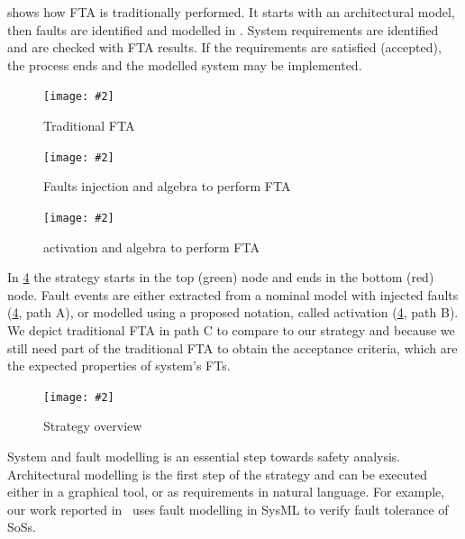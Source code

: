 \documentclass[12pt,openright,twoside,a4paper,oldfontcommands,english,brazil,final]{abntex2}
\theoremstyle{theo}
\newcommand{\includegraphicsaspectratio}[2][1]{%
  \texttt{[image: \#2]}%
}
\begin{document}
 shows how \ac{FTA} is traditionally performed.
It starts with an architectural model, then faults are identified and modelled in .
System requirements are identified and are checked with \ac{FTA} results.
If the requirements are satisfied (accepted), the process ends and the modelled system may be implemented.

\begin{figure}[htb]
  \centering
  \includegraphicsaspectratio[0.55]{StrategyOverview-traditional-path}
  \caption{Traditional \ac{FTA}}
  \label{fig:strategy-overview-traditional}
\end{figure}

\begin{figure}[htb]
  \centering
  \includegraphicsaspectratio[0.8]{StrategyOverview-csp-path}
  \caption{Faults injection and \ac{algebra} to perform \ac{FTA}}
  \label{fig:strategy-overview-csp}
\end{figure}

\begin{figure}[htb]
  \centering
  \includegraphicsaspectratio[0.8]{StrategyOverview-activation-path}
  \caption{\Ac{activation} and \ac{algebra} to perform \ac{FTA}}
  \label{fig:strategy-overview-activation}
\end{figure}

In \cref{fig:strategy-overview} the strategy starts in the top (green) node and ends in the bottom (red) node.
Fault events are either extracted from a nominal model with injected faults (\cref{fig:strategy-overview}, path A), or modelled using a proposed notation, called \ac{activation} (\cref{fig:strategy-overview}, path B).
We depict traditional \ac{FTA} in path C to compare to our strategy and because we still need part of the traditional \ac{FTA} to obtain the acceptance criteria, which are the expected properties of system's \acp{FT}.

\begin{figure}[htb]
  \centering
  \includegraphicsaspectratio[0.9]{StrategyOverview}
  \caption{Strategy overview}
  \label{fig:strategy-overview}
\end{figure}

System and fault modelling is an essential step towards safety analysis.
Architectural modelling is the first step of the strategy and can be executed either in a graphical tool, or as requirements in natural language.
For example, our work reported in~\cite{APR+2013,ADP+2013} uses fault modelling in \ac{SysML} to verify fault tolerance of \acp{SoS}.
\end{document}
